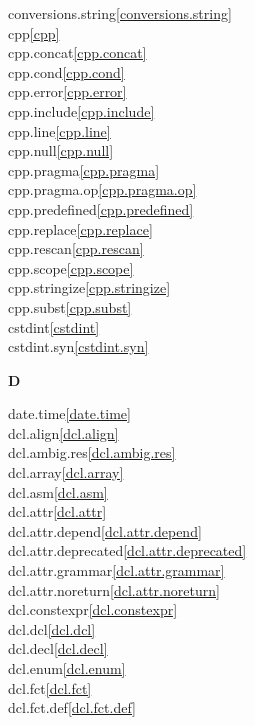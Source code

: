 \begin{multicols}{2}
conversions.string\quad\ref{conversions.string}\\
cpp\quad\ref{cpp}\\
cpp.concat\quad\ref{cpp.concat}\\
cpp.cond\quad\ref{cpp.cond}\\
cpp.error\quad\ref{cpp.error}\\
cpp.include\quad\ref{cpp.include}\\
cpp.line\quad\ref{cpp.line}\\
cpp.null\quad\ref{cpp.null}\\
cpp.pragma\quad\ref{cpp.pragma}\\
cpp.pragma.op\quad\ref{cpp.pragma.op}\\
cpp.predefined\quad\ref{cpp.predefined}\\
cpp.replace\quad\ref{cpp.replace}\\
cpp.rescan\quad\ref{cpp.rescan}\\
cpp.scope\quad\ref{cpp.scope}\\
cpp.stringize\quad\ref{cpp.stringize}\\
cpp.subst\quad\ref{cpp.subst}\\
cstdint\quad\ref{cstdint}\\
cstdint.syn\quad\ref{cstdint.syn}\\
\par \textbf{D}\par
date.time\quad\ref{date.time}\\
dcl.align\quad\ref{dcl.align}\\
dcl.ambig.res\quad\ref{dcl.ambig.res}\\
dcl.array\quad\ref{dcl.array}\\
dcl.asm\quad\ref{dcl.asm}\\
dcl.attr\quad\ref{dcl.attr}\\
dcl.attr.depend\quad\ref{dcl.attr.depend}\\
dcl.attr.deprecated\quad\ref{dcl.attr.deprecated}\\
dcl.attr.grammar\quad\ref{dcl.attr.grammar}\\
dcl.attr.noreturn\quad\ref{dcl.attr.noreturn}\\
dcl.constexpr\quad\ref{dcl.constexpr}\\
dcl.dcl\quad\ref{dcl.dcl}\\
dcl.decl\quad\ref{dcl.decl}\\
dcl.enum\quad\ref{dcl.enum}\\
dcl.fct\quad\ref{dcl.fct}\\
dcl.fct.def\quad\ref{dcl.fct.def}\\

\end{multicols}
